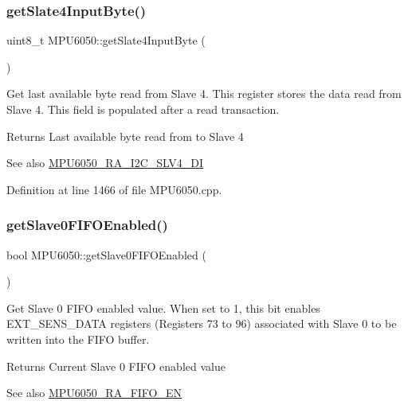 \subsubsection{\texorpdfstring{getSlate4InputByte()}{getSlate4InputByte()}}
{\footnotesize\ttfamily uint8\+\_\+t M\+P\+U6050\+::get\+Slate4\+Input\+Byte (\begin{DoxyParamCaption}{ }\end{DoxyParamCaption})}

Get last available byte read from Slave 4. This register stores the data read from Slave 4. This field is populated after a read transaction. \begin{DoxyReturn}{Returns}
Last available byte read from to Slave 4 
\end{DoxyReturn}
\begin{DoxySeeAlso}{See also}
\mbox{\hyperlink{MPU6050_8h_a80d3591c47d0482c0adcf176e1994a65}{M\+P\+U6050\+\_\+\+R\+A\+\_\+\+I2\+C\+\_\+\+S\+L\+V4\+\_\+\+DI}} 
\end{DoxySeeAlso}


Definition at line 1466 of file M\+P\+U6050.\+cpp.


\begin{DoxyCode}{0}

\end{DoxyCode}
\mbox{\label{classMPU6050_a6aa7aa2e3fac06f8b5ab9ee127255a5e}} 
\subsubsection{\texorpdfstring{getSlave0FIFOEnabled()}{getSlave0FIFOEnabled()}}
{\footnotesize\ttfamily bool M\+P\+U6050\+::get\+Slave0\+F\+I\+F\+O\+Enabled (\begin{DoxyParamCaption}{ }\end{DoxyParamCaption})}

Get Slave 0 F\+I\+FO enabled value. When set to 1, this bit enables E\+X\+T\+\_\+\+S\+E\+N\+S\+\_\+\+D\+A\+TA registers (Registers 73 to 96) associated with Slave 0 to be written into the F\+I\+FO buffer. \begin{DoxyReturn}{Returns}
Current Slave 0 F\+I\+FO enabled value 
\end{DoxyReturn}
\begin{DoxySeeAlso}{See also}
\mbox{\hyperlink{MPU6050_8h_a1166fe50f4792f3266e15dc3273e375d}{M\+P\+U6050\+\_\+\+R\+A\+\_\+\+F\+I\+F\+O\+\_\+\+EN}} 
\end{DoxySeeAlso}


